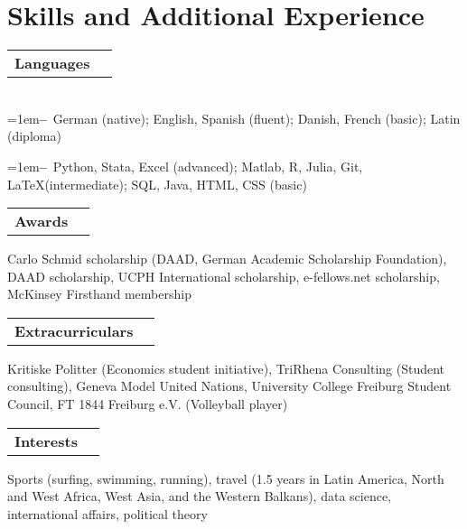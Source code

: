 \documentclass[A4,11pt]{article}
\makeatletter
\newcommand{\Subheading}[4]{   
    \begin{tabular*}{\textwidth}[t]{@{}l @{\extracolsep{\fill}} r@{}}
        \textbf{#1}\textit{\small #2} & \footnotesize #3 \\
    \end{tabular*}
    \small #4 
    \vspace{7pt}
}
\newcommand{\myitem}[1]{\hangindent=1em\hangafter=1\textbf{--}~#1\par}
\makeatother
\begin{document}
\section{Skills and Additional Experience}

    \Subheading
        {Languages}{}{}
        {\\
        \myitem{German (native); English, Spanish (fluent); Danish, French (basic); Latin (diploma)}
        \myitem{Python, Stata, Excel (advanced); Matlab, R, Julia, Git, \LaTeX\space(intermediate); SQL, Java, HTML, CSS (basic)}
        }
    

    \Subheading
        {Awards}{}{}
        {Carlo Schmid scholarship (DAAD, German Academic Scholarship Foundation), 
        DAAD scholarship, 
        UCPH International scholarship, 
        e-fellows.net scholarship, 
        McKinsey Firsthand membership
        } 

    \Subheading
        {Extracurriculars}{}{}
        {Kritiske Politter (Economics student initiative), TriRhena Consulting (Student consulting), 
        Geneva Model United Nations, University College Freiburg Student Council, FT 1844 Freiburg e.V. (Volleyball player)}{}

    \Subheading
        {Interests}{}{}
        {Sports (surfing, swimming, running), travel (1.5 years in Latin America, North and West Africa, West Asia, and the Western Balkans), data science, international affairs, political theory}

\vfill
{}
\end{document}
